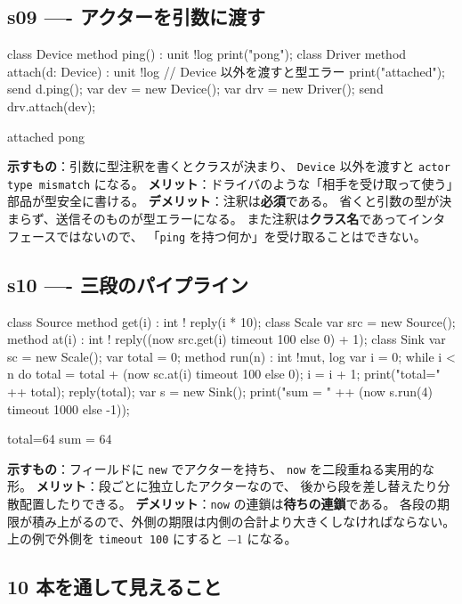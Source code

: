 \documentclass[11pt,a4paper]{ltjsarticle}
\theoremstyle{definition}
\theoremstyle{remark}
\begin{document}
\subsection{s09 ---- アクターを引数に渡す}
\begin{aipl}
class Device { method ping() : unit !{log} { print("pong"); } }
class Driver {
  method attach(d: Device) : unit !{log} {   // Device 以外を渡すと型エラー
    print("attached");
    send d.ping();
  }
}
var dev = new Device();
var drv = new Driver();
send drv.attach(dev);
\end{aipl}
\begin{term}
attached
pong
\end{term}
\textbf{示すもの}：引数に型注釈を書くとクラスが決まり、
\texttt{Device} 以外を渡すと \texttt{actor type mismatch} になる。
\textbf{メリット}：ドライバのような「相手を受け取って使う」部品が型安全に書ける。
\textbf{デメリット}：注釈は\textbf{必須}である。
省くと引数の型が決まらず、送信そのものが型エラーになる。
また注釈は\textbf{クラス名}であってインタフェースではないので、
「\texttt{ping} を持つ何か」を受け取ることはできない。

\subsection{s10 ---- 三段のパイプライン}
\begin{aipl}
class Source { method get(i) : int !{} { reply(i * 10); } }
class Scale  {
  var src = new Source();
  method at(i) : int !{} { reply((now src.get(i) timeout 100 else 0) + 1); }
}
class Sink {
  var sc = new Scale();
  var total = 0;
  method run(n) : int !{mut, log} {
    var i = 0;
    while i < n do {
      total = total + (now sc.at(i) timeout 100 else 0);
      i = i + 1;
    }
    print("total=" ++ total);
    reply(total);
  }
}
var s = new Sink();
print("sum = " ++ (now s.run(4) timeout 1000 else -1));
\end{aipl}
\begin{term}
total=64
sum = 64
\end{term}
\textbf{示すもの}：フィールドに \texttt{new} でアクターを持ち、
\texttt{now} を二段重ねる実用的な形。
\textbf{メリット}：段ごとに独立したアクターなので、
後から段を差し替えたり分散配置したりできる。
\textbf{デメリット}：\texttt{now} の連鎖は\textbf{待ちの連鎖}である。
各段の期限が積み上がるので、外側の期限は内側の合計より大きくしなければならない。
上の例で外側を \texttt{timeout 100} にすると $-1$ になる。

\subsection{10 本を通して見えること}
\end{document}
